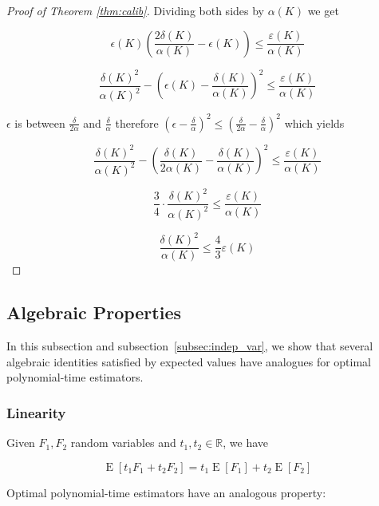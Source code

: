 \documentclass[11pt]{article}
\numberwithin{equation}{section}
\theoremstyle{definition}
\theoremstyle{plain}
\DeclareMathOperator{\E}{E}
\newcommand{\Reals}{\mathbb{R}}
\begin{document}
\begin{proof}[Proof of Theorem \ref{thm:calib}]
Dividing both sides by $ \alpha(K)$ we get

$$\epsilon(K) \left(\frac{2\delta(K)}{\alpha(K)} - \epsilon(K)\right) \leq \frac{\varepsilon(K)}{\alpha(K)}$$

$$\frac{\delta(K)^2}{\alpha(K)^2}-\left(\epsilon(K) - \frac{\delta(K)}{\alpha(K)}\right)^2 \leq \frac{\varepsilon(K)}{\alpha(K)}$$

$\epsilon$ is between $\frac{\delta}{2\alpha}$ and $\frac{\delta}{\alpha}$ therefore $(\epsilon-\frac{\delta}{\alpha})^2 \leq (\frac{\delta}{2\alpha} - \frac{\delta}{\alpha})^2$  which yields

$$\frac{\delta(K)^2}{\alpha(K)^2}-\left(\frac{\delta(K)}{2\alpha(K)} - \frac{\delta(K)}{\alpha(K)}\right)^2 \leq \frac{\varepsilon(K)}{\alpha(K)}$$

$$\frac{3}{4} \cdot \frac{\delta(K)^2}{\alpha(K)^2} \leq \frac{\varepsilon(K)}{\alpha(K)}$$

$$\frac{\delta(K)^2}{\alpha(K)} \leq \frac{4}{3}\varepsilon(K)$$
\end{proof}

\subsection{Algebraic Properties}
\label{subsec:alg}

In this subsection and subsection~\ref{subsec:indep_var}, we show that several algebraic identities satisfied by expected values have analogues for optimal polynomial-time estimators.

\subsubsection{Linearity}

Given $F_1,F_2$ random variables and $t_1,t_2 \in \Reals$, we have 

\begin{equation}
\E[t_1 F_1 + t_2 F_2] = t_1 \E[F_1] + t_2 \E[F_2]
\end{equation}

Optimal polynomial-time estimators have an analogous property:
\end{document}
